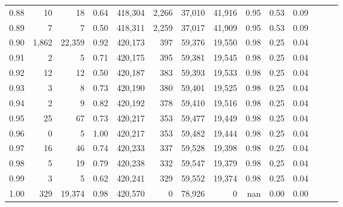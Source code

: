 \begin{tabular}{rrrrrrrrrrrrrr}
0.88 &      10 &      18 &  0.64 &  418,304 &    2,266 &  37,010 &  41,916 &  0.95 &  0.53 &      0.09 \\
0.89 &       7 &       7 &  0.50 &  418,311 &    2,259 &  37,017 &  41,909 &  0.95 &  0.53 &      0.09 \\
0.90 &   1,862 &  22,359 &  0.92 &  420,173 &      397 &  59,376 &  19,550 &  0.98 &  0.25 &      0.04 \\
0.91 &       2 &       5 &  0.71 &  420,175 &      395 &  59,381 &  19,545 &  0.98 &  0.25 &      0.04 \\
0.92 &      12 &      12 &  0.50 &  420,187 &      383 &  59,393 &  19,533 &  0.98 &  0.25 &      0.04 \\
0.93 &       3 &       8 &  0.73 &  420,190 &      380 &  59,401 &  19,525 &  0.98 &  0.25 &      0.04 \\
0.94 &       2 &       9 &  0.82 &  420,192 &      378 &  59,410 &  19,516 &  0.98 &  0.25 &      0.04 \\
0.95 &      25 &      67 &  0.73 &  420,217 &      353 &  59,477 &  19,449 &  0.98 &  0.25 &      0.04 \\
0.96 &       0 &       5 &  1.00 &  420,217 &      353 &  59,482 &  19,444 &  0.98 &  0.25 &      0.04 \\
0.97 &      16 &      46 &  0.74 &  420,233 &      337 &  59,528 &  19,398 &  0.98 &  0.25 &      0.04 \\
0.98 &       5 &      19 &  0.79 &  420,238 &      332 &  59,547 &  19,379 &  0.98 &  0.25 &      0.04 \\
0.99 &       3 &       5 &  0.62 &  420,241 &      329 &  59,552 &  19,374 &  0.98 &  0.25 &      0.04 \\
1.00 &     329 &  19,374 &  0.98 &  420,570 &        0 &  78,926 &       0 &   nan &  0.00 &      0.00 \\
\bottomrule
\end{tabular}
